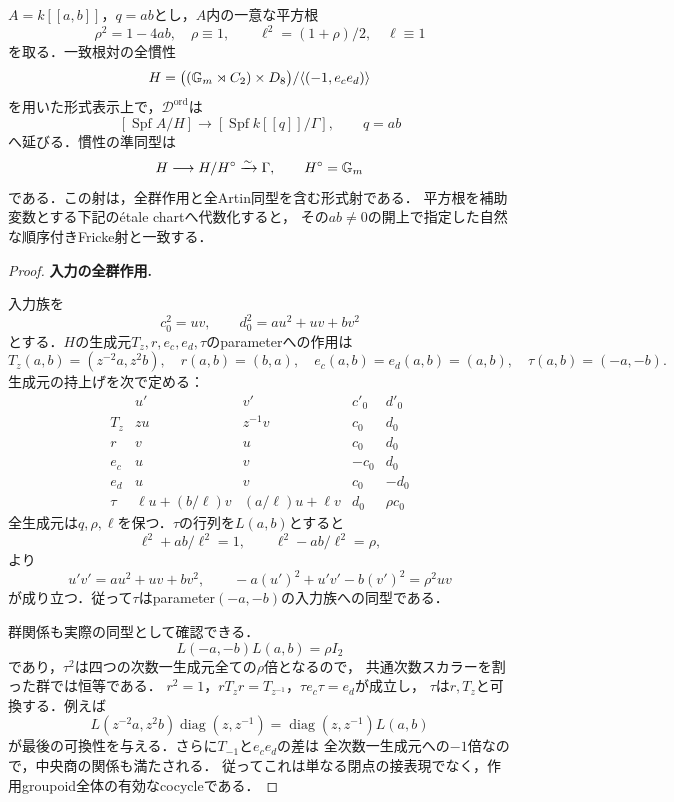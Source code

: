 \begin{theorem}[自然なFricke射の形式延長]
\label{thm:qa-fricke-formal-equivariant-extension}
$A=k[[a,b]]$，$q=ab$とし，$A$内の一意な平方根
\[
 \rho^2=1-4ab,\quad\rho\equiv1,\qquad
 \ell^2=(1+\rho)/2,\quad\ell\equiv1
\]
を取る．一致根対の全慣性
\[
 H=\bigl((\mathbb G_m\rtimes C_2)\times D_8\bigr)
       /\langle(-1,e_ce_d)\rangle
\]
を用いた形式表示上で，$\mathscr D^{\mathrm{ord}}$は
\[
 \boxed{
 [\operatorname{Spf}A/H]\longrightarrow
 [\operatorname{Spf}k[[q]]/\Gamma],\qquad
 q=ab
 }
\]
へ延びる．慣性の準同型は
\[
 H\longrightarrow H/H^\circ\xrightarrow{\sim}\Gamma,
 \qquad H^\circ=\mathbb G_m
\]
である．この射は，全群作用と全Artin同型を含む形式射である．
平方根を補助変数とする下記の\'etale chartへ代数化すると，
その$ab\ne0$の開上で指定した自然な順序付きFricke射と一致する．
\end{theorem}
\begin{proof}
\par\medskip\noindent\textbf{入力の全群作用.}\par\nobreak\smallskip
入力族を
\[
 c_0^2=uv,\qquad d_0^2=au^2+uv+bv^2
\]
とする．$H$の生成元$T_z,r,e_c,e_d,\tau$のparameterへの作用は
\[
 T_z(a,b)=(z^{-2}a,z^2b),\quad r(a,b)=(b,a),\quad
 e_c(a,b)=e_d(a,b)=(a,b),\quad\tau(a,b)=(-a,-b).
\]
生成元の持上げを次で定める：
\[
 \begin{array}{c|cccc}
 &u'&v'&c'_0&d'_0\\\hline
 T_z&zu&z^{-1}v&c_0&d_0\\
 r&v&u&c_0&d_0\\
 e_c&u&v&-c_0&d_0\\
 e_d&u&v&c_0&-d_0\\
 \tau&\ell u+(b/\ell)v&(a/\ell)u+\ell v&d_0&\rho c_0
 \end{array}
\]
全生成元は$q,\rho,\ell$を保つ．$\tau$の行列を$L(a,b)$とすると
\[
 \ell^2+ab/\ell^2=1,\qquad
 \ell^2-ab/\ell^2=\rho,
\]
より
\[
 u'v'=au^2+uv+bv^2,
 \qquad -a(u')^2+u'v'-b(v')^2=\rho^2uv
\]
が成り立つ．従って$\tau$はparameter$(-a,-b)$の入力族への同型である．

群関係も実際の同型として確認できる．
\[
 L(-a,-b)L(a,b)=\rho I_2
\]
であり，$\tau^2$は四つの次数一生成元全ての$\rho$倍となるので，
共通次数スカラーを割った群では恒等である．
$r^2=1$，$rT_zr=T_{z^{-1}}$，$\tau e_c\tau=e_d$が成立し，
$\tau$は$r,T_z$と可換する．例えば
\[
 L(z^{-2}a,z^2b)\operatorname{diag}(z,z^{-1})
 =\operatorname{diag}(z,z^{-1})L(a,b)
\]
が最後の可換性を与える．さらに$T_{-1}$と$e_ce_d$の差は
全次数一生成元への$-1$倍なので，中央商の関係も満たされる．
従ってこれは単なる閉点の接表現でなく，作用groupoid全体の有効なcocycleである．


\end{proof}
